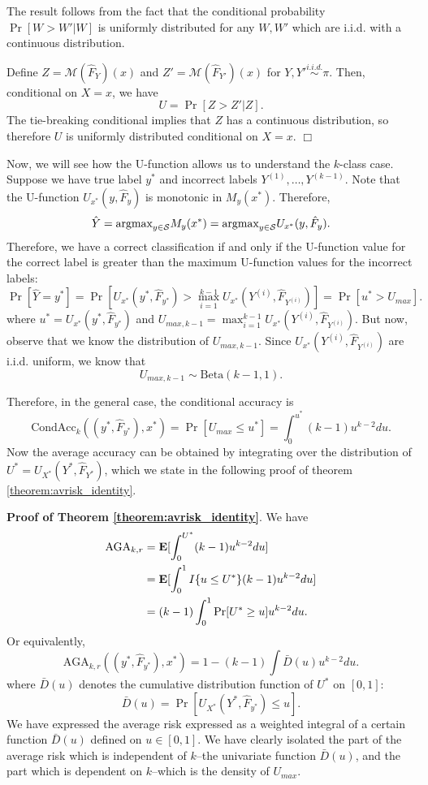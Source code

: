\documentclass[12pt]{article}
\begin{document}
The result follows from the fact that the conditional probability
$\Pr[W > W'|W]$ is uniformly distributed for any $W, W'$ which are
i.i.d. with a continuous distribution.  

Define $Z = \mathcal{M}(\hat{F}_{Y})(x)$ and $Z' =
\mathcal{M}(\hat{F}_{Y'})(x)$ for $Y, Y' \stackrel{i.i.d.}{\sim} \pi$.
Then, conditional on $X = x$, we have
\[
U = \Pr[Z > Z'|Z].
\]
The tie-breaking conditional implies that $Z$ has a continuous
distribution, so therefore $U$ is uniformly distributed conditional on
$X = x$.  $\Box$

Now, we will see how the U-function allows us to understand the
$k$-class case.  Suppose we have true label $y^*$ and incorrect labels
$Y^{(1)},\hdots, Y^{(k-1)}$.  Note that the U-function
$U_{x^*}(y, \hat{F}_y)$ is monotonic in $M_y(x^*)$.  Therefore,
\[
\hat{Y} = \text{argmax}_{y \in \mathcal{S}} M_y(x^*) = \text{argmax}_{y \in \mathcal{S}} U_{x^*}(y, \hat{F}_y).
\]
Therefore, we have a correct classification if and only if the U-function value for the correct label
is greater than the maximum U-function values for the incorrect labels:
\[
\Pr[\hat{Y} = y^*] = \Pr[U_{x^*}(y^*, \hat{F}_{y^*}) > \max_{i=1}^{k-1} U_{x^*}(Y^{(i)}, \hat{F}_{Y^{(i)}})] =  \Pr[u^* > U_{max}].
\]
where $u^* = U_{x^*}(y^*, \hat{F}_{y^*})$ and $U_{max, k-1}
= \max_{i=1}^{k-1} U_{x^*}(Y^{(i)}, \hat{F}_{Y^{(i)}})$.  But now,
observe that we know the distribution of $U_{max, k-1}$.  Since
$U_{x^*}(Y^{(i)}, \hat{F}_{Y^{(i)}})$ are i.i.d. uniform, we know that
\begin{equation}\label{eq:umax_beta}
U_{max, k-1} \sim \text{Beta}(k-1, 1). 
\end{equation}

Therefore, in the general case, the conditional accuracy is
\[
\text{CondAcc}_k((y^*, \hat{F}_{y^*}), x^*) = \Pr[U_{max} \leq u^*] = \int_0^{u^*} (k-1) u^{k-2} du.
\]
Now the average accuracy can be obtained by integrating over the
distribution of $U^* = U_{X^*}(Y^*, \hat{F}_{Y^*})$, which we state in
the following proof of theorem \ref{theorem:avrisk_identity}.

\noindent\textbf{Proof of Theorem \ref{theorem:avrisk_identity}}.
We have
\begin{align*}
\text{AGA}_{k,r} &= \textbf{E}[\int_0^{U^*} (k-1) u^{k-2} du] 
\\&= \textbf{E}[\int_0^1 I\{u \leq U^*\} (k-1) u^{k-2} du ]
\\&= (k-1) \int_0^1 \Pr[U^* \geq u] u^{k-2} du.
\end{align*}
Or equivalently,
\[
\text{AGA}_{k, r}((y^*, \hat{F}_{y^*}), x^*) = 1 - (k-1) \int \bar{D}(u) u^{k-2} du.
\]
where $\bar{D}(u)$ denotes the cumulative distribution function of $U^*$ on $[0,1]$:
\begin{equation}\label{eq:Kbar}
\bar{D}(u) = \Pr[U_{X^*}(Y^*, \hat{F}_{y^*}) \leq u].
\end{equation}
We have expressed the average risk expressed as a weighted integral of
a certain function $\bar{D}(u)$ defined on $u \in [0,1]$.  We have
clearly isolated the part of the average risk which is independent of
$k$--the univariate function $\bar{D}(u)$, and the part which is
dependent on $k$--which is the density of $U_{max}$.
\end{document}
